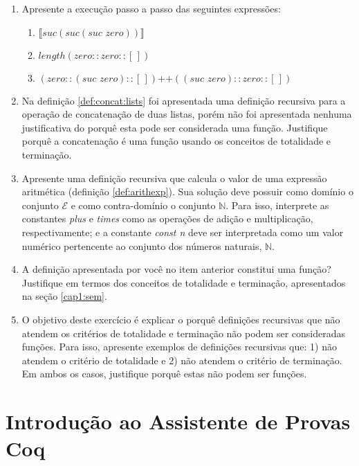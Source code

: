 \begin{enumerate}
  \item Apresente a execu\c{c}\~ao passo a passo das seguintes express\~oes:
  \begin{enumerate}
    \item $\llbracket suc (suc (suc\,\,zero))\rrbracket$ 
    \item $length (zero :: zero :: [\,])$
    \item $(zero :: (suc\,\, zero) ::[\,])\text{++}((suc\,\,zero) :: zero :: [\,])$
  \end{enumerate}
  \item Na defini\c{c}\~ao \ref{def:concat:lists} foi apresentada uma defini\c{c}\~ao recursiva para a opera\c{c}\~ao de concatena\c{c}\~ao de
        duas listas, por\'em n\~ao foi apresentada nenhuma justificativa do porqu\^e esta pode ser considerada uma fun\c{c}\~ao. Justifique
        porqu\^e a concatena\c{c}\~ao \'e uma fun\c{c}\~ao usando os conceitos de totalidade e termina\c{c}\~ao.
  \item Apresente uma defini\c{c}\~ao recursiva que calcula o valor de uma express\~ao aritm\'etica (defini\c{c}\~ao \ref{def:arithexp}).
        Sua solu\c{c}\~ao deve possuir como dom\'inio o conjunto $\mathcal{E}$ e como contra-dom\'inio o conjunto $\mathbb{N}$. Para isso, 
        interprete as constantes \textit{plus} e \textit{times} como as opera\c{c}\~oes de adi\c{c}\~ao e multiplica\c{c}\~ao, respectivamente; e
        a constante \textit{const n} deve ser interpretada como um valor num\'erico pertencente ao conjunto dos n\'umeros naturais, $\mathbb{N}$.
  \item A defini\c{c}\~ao apresentada por voc\^e no item anterior constitui uma fun\c{c}\~ao? Justifique em termos dos conceitos de totalidade
        e termina\c{c}\~ao, apresentados na se\c{c}\~ao \ref{cap1:sem}.
  \item O objetivo deste exerc\'icio \'e explicar o porqu\^e defini\c{c}\~oes recursivas que n\~ao atendem os crit\'erios de totalidade e 
        termina\c{c}\~ao n\~ao podem ser consideradas fun\c{c}\~oes. 
        Para isso, apresente exemplos de defini\c{c}\~oes recursivas que: 1) n\~ao atendem o crit\'erio de 
        totalidade e 2) n\~ao atendem o crit\'erio de termina\c{c}\~ao. Em ambos os casos, justifique porqu\^e estas n\~ao podem ser 
        fun\c{c}\~oes.        
\end{enumerate}

\section{Introdu\c{c}\~ao ao Assistente de Provas Coq}\label{cap1:coq}

